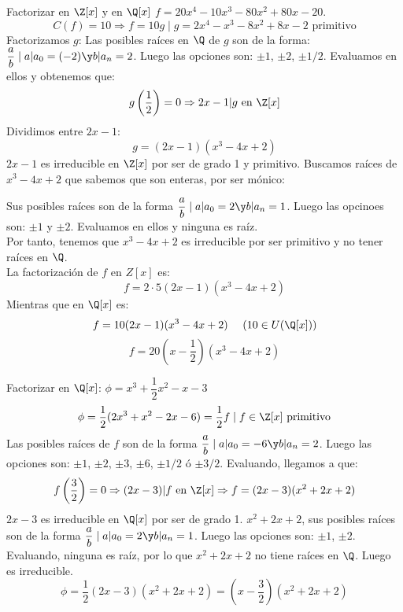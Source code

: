 \begin{ejemplo}
    Factorizar en $\Z[x]$ y en $\Q[x]$ $f=20x^4-10x^3-80x^2+80x-20$.
    $$C(f) = 10 \Rightarrow f=10g \mid g = 2x^4-x^3-8x^2+8x-2 \mbox{ primitivo}$$
    Factorizamos $g$:\newline
    Las posibles raíces en $\Q$ de $g$ son de la forma: $\dfrac{a}{b} \mid a|a_0=(-2) \y b|a_n=2$.\newline
    Luego las opciones son: $\pm1$, $\pm2$, $\pm 1/2$. Evaluamos en ellos y obtenemos que:
    $$g\left(\dfrac{1}{2}\right) = 0 \Rightarrow 2x-1|g \mbox{ en } \Z[x]$$
    Dividimos entre $2x-1$:
    $$g=(2x-1)(x^3-4x+2)$$
    $2x-1$ es irreducible en $\Z[x]$ por ser de grado 1 y primitivo.\newline
    Buscamos raíces de $x^3-4x+2$ que sabemos que son enteras, por ser mónico:\par
    Sus posibles raíces son de la forma $\dfrac{a}{b} \mid a|a_0=2 \y b|a_n=1$.\newline
    Luego las opcinoes son: $\pm1$ y $\pm2$. Evaluamos en ellos y ninguna es raíz.\\

    
    Por tanto, tenemos que $x^3-4x+2$ es irreducible por ser primitivo y no tener raíces en $\Q$.\\

    
    La factorización de $f$ en $Z[x]$ es:
    $$f=2 \cdot 5(2x-1)(x^3-4x+2)$$
    Mientras que en $\Q[x]$ es:
    $$f=10(2x-1)(x^3-4x+2)~~~~(10 \in U(\Q[x]))$$
    $$f=20\left(x-\dfrac{1}{2}\right)(x^3-4x+2)$$
\end{ejemplo}

\begin{ejemplo}
    Factorizar en $\Q[x]$: $\phi=x^3+\dfrac{1}{2}x^2-x-3$
    $$\phi = \dfrac{1}{2}(2x^3+x^2-2x-6)=\dfrac{1}{2}f \mid f \in \Z[x] \mbox{ primitivo}$$
    Las posibles raíces de $f$ son de la forma $\dfrac{a}{b} \mid a|a_0=-6 \y b|a_n=2$.\newline
    Luego las opciones son: $\pm1$, $\pm2$, $\pm3$, $\pm6$, $\pm1/2$ ó $\pm3/2$. Evaluando, llegamos a que:
    $$f\left(\dfrac{3}{2}\right)=0 \Rightarrow (2x-3)|f \mbox{ en } \Z[x] \Rightarrow f=(2x-3)(x^2+2x+2)$$
    $2x-3$ es irreducible en $\Q[x]$ por ser de grado 1.\newline
    $x^2+2x+2$, sus posibles raíces son de la forma $\dfrac{a}{b} \mid a|a_0=2 \y b|a_n=1$.\newline
    Luego las opciones son: $\pm1$, $\pm2$. Evaluando, ninguna es raíz, por lo que $x^2+2x+2$ no tiene raíces en $\Q$.
    Luego es irreducible.\\

    $$\phi = \dfrac{1}{2}(2x-3)(x^2+2x+2) = \left( x-\dfrac{3}{2} \right)(x^2+2x+2)$$
\end{ejemplo}

